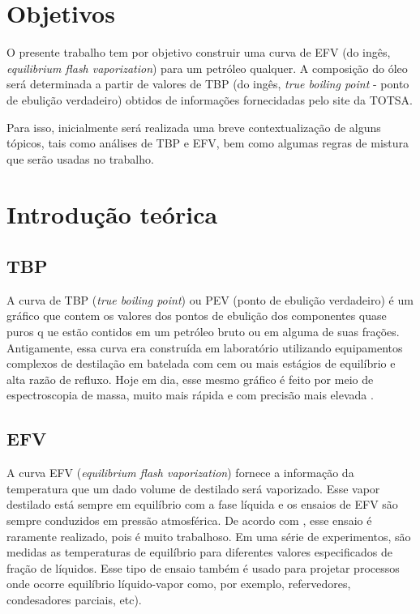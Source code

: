 \section{Objetivos}
O presente trabalho tem por objetivo construir uma curva de EFV (do
ingês, \emph{equilibrium flash vaporization}) para um petróleo qualquer. A
composição do óleo será determinada a partir de valores de TBP (do ingês,
\emph{true boiling point} - ponto de ebulição verdadeiro) obtidos de
informações fornecidadas pelo site da TOTSA.

Para isso, inicialmente será realizada uma breve contextualização de alguns
tópicos, tais como análises de TBP e EFV, bem como algumas regras de mistura
que serão usadas no trabalho.

\section{Introdução teórica}

\subsection{TBP}
A curva de TBP (\emph{true boiling point}) ou PEV (ponto de ebulição verdadeiro)
é um gráfico que contem os valores dos pontos de ebulição  dos componentes quase puros q
ue estão contidos em um petróleo bruto ou em alguma de suas frações. Antigamente, 
essa curva era construída em laboratório utilizando equipamentos complexos de 
destilação em batelada com cem ou mais estágios de equilíbrio e alta razão de 
refluxo. Hoje em dia, esse mesmo gráfico é feito por meio de espectroscopia de massa, 
muito mais rápida e com precisão mais elevada \cite{Jones2006}.

\subsection{EFV}


A curva EFV (\emph{equilibrium flash vaporization}) fornece a informação da
temperatura que um dado volume de destilado será vaporizado. Esse vapor
destilado está sempre em equilíbrio com a fase líquida e os ensaios de EFV são
sempre conduzidos em pressão atmosférica. De acordo com ,
esse ensaio é raramente realizado, pois é muito trabalhoso. Em uma série de
experimentos, são medidas as temperaturas de equilíbrio para diferentes valores especificados de 
 fração de líquidos. Esse tipo de ensaio também é usado para projetar processos
 onde ocorre equilíbrio líquido-vapor como, por exemplo, refervedores, condesadores
  parciais, etc).
  
